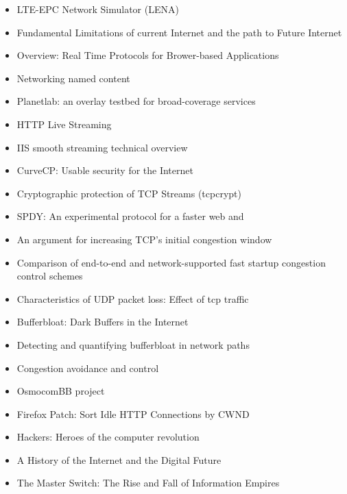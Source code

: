 \begin{itemize}

\item LTE-EPC Network Simulator (LENA) \cite{ns3lte}
\item Fundamental Limitations of current Internet and the path to Future Internet \cite{ec2011fundamental}
\item Overview: Real Time Protocols for Brower-based Applications\cite{ietf2011rtcwebdraft}
\item Networking named content \cite{jacobson2009networking}
\item Planetlab: an overlay testbed for broad-coverage services \cite{chun2003planetlab}
\item HTTP Live Streaming \cite{pantos2011livestreaming}
\item IIS smooth streaming technical overview \cite{zambelli_iis_2009}
\item CurveCP: Usable security for the Internet \cite{curvecpwww}
\item Cryptographic protection of TCP Streams (tcpcrypt) \cite{tcpcrypt}
\item SPDY: An experimental protocol for a faster web \cite{google2011SPDYdef} and \cite{google2010SPDYwp}
\item An argument for increasing TCP's initial congestion window \cite{dukkipati2010argument}
\item Comparison of end-to-end and network-supported fast startup congestion control schemes \cite{scharf2011comparison}
\item Characteristics of UDP packet loss: Effect of tcp traffic \cite{sawashima97characteristics}
\item Bufferbloat: Dark Buffers in the Internet \cite{gettys2011bufferbloat}
\item Detecting and quantifying bufferbloat in network paths \cite{groenewegen2011detecting}
\item Congestion avoidance and control \cite{jacobson1988congestion}
\item OsmocomBB project \cite{osmocombbwww}
\item Firefox Patch: Sort Idle HTTP Connections by CWND \cite{ffSortCWND}
\item Hackers: Heroes of the computer revolution \cite{levy2001hackers}
\item A History of the Internet and the Digital Future \cite{ryan2010history}
\item The Master Switch: The Rise and Fall of Information Empires \cite{wu2010master}

\end{itemize}
